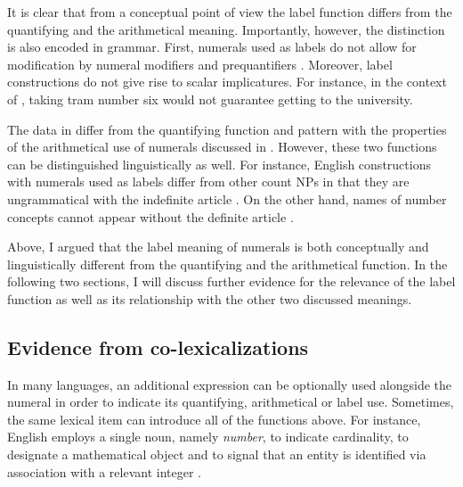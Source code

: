 \documentclass[output=paper]{langscibook}
\begin{document}
    It is clear that from a conceptual point of view the label function differs from the quantifying and the arithmetical meaning. Importantly, however, the distinction is also encoded in grammar. First, numerals used as labels do not allow for modification by numeral modifiers and prequantifiers . Moreover, label constructions do not give rise to scalar implicatures. For instance, in the context of , taking tram number six would not guarantee getting to the university.

\ea\label{ex:label-tests} \label{ex:label-modification}
\label{ex:label-scalar}
\z
\z

\noindent The data in  differ from the quantifying function and pattern with the properties of the arithmetical use of numerals discussed in . However, these two functions can be distinguished linguistically as well. For instance, English constructions with numerals used as labels differ from other count NPs in that they are ungrammatical with the indefinite article . On the other hand, names of number concepts cannot appear without the definite article  \citep[for a detailed discussion of English phrases such as \textit{number five}, see][124--129]{bultinck2005numerous}. 
	
	\ea\label{ex:grammar-article} \label{ex:grammar-article-label} 
	\label{ex:grammar-article-arithmetical} 
	\z
	\z

    \noindent Above, I argued that the label meaning of numerals is both conceptually and linguistically different from the quantifying and the arithmetical function. In the following two sections, I will discuss further evidence for the relevance of the label function as well as its relationship with the other two discussed meanings.

	\subsection{Evidence from co-lexicalizations}\label{sec:evidence-from-co-lexicalizations}
	
		In many languages, an additional expression can be optionally used alongside the numeral in order to indicate its quantifying, arithmetical or label use. Sometimes, the same lexical item can introduce all of the functions above. For instance, English employs a single noun, namely \textit{number}, to indicate cardinality, to designate a mathematical object and to signal that an entity is identified via association with a relevant integer . 
	
\end{document}
